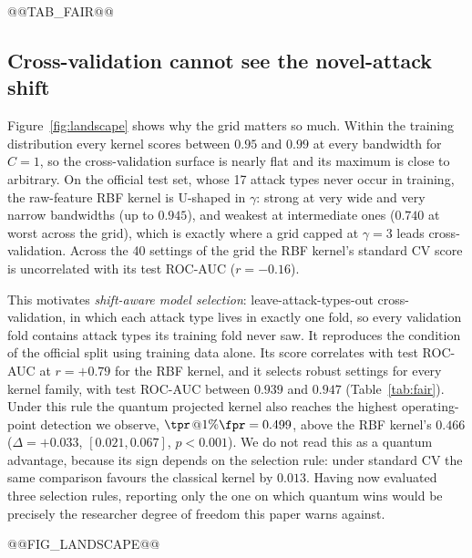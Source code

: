 @@TAB_FAIR@@

\subsection{Cross-validation cannot see the novel-attack shift}\label{sec:kcv}
Figure~\ref{fig:landscape} shows why the grid matters so much. Within the training distribution every
kernel scores between $0.95$ and $0.99$ at every bandwidth for $C=1$, so the cross-validation surface is nearly flat
and its maximum is close to arbitrary. On the official test set, whose 17 attack types never occur in
training, the raw-feature RBF kernel is U-shaped in $\gamma$: strong at very wide and very narrow
bandwidths (up to $0.945$), and weakest at intermediate ones ($0.740$ at worst across the grid), which is exactly where a
grid capped at $\gamma=3$ leads cross-validation. Across the 40 settings of the grid the RBF kernel's
standard CV score is uncorrelated with its test ROC-AUC ($r=-0.16$).

This motivates \emph{shift-aware model selection}: leave-attack-types-out cross-validation, in which each
attack type lives in exactly one fold, so every validation fold contains attack types its training fold
never saw. It reproduces the condition of the official split using training data alone. Its score
correlates with test ROC-AUC at $r=+0.79$ for the RBF kernel, and it selects robust settings for every
kernel family, with test ROC-AUC between $0.939$ and $0.947$ (Table~\ref{tab:fair}). Under this rule the
quantum projected kernel also reaches the highest operating-point detection we observe,
$\tpr$@$1\%\fpr=0.499$, above the RBF kernel's $0.466$ ($\Delta=+0.033$, $[0.021,0.067]$, $p<0.001$). We do
not read this as a quantum advantage, because its sign depends on the selection rule: under standard CV
the same comparison favours the classical kernel by $0.013$. Having now evaluated three selection rules,
reporting only the one on which quantum wins would be precisely the researcher degree of freedom this
paper warns against.

@@FIG_LANDSCAPE@@


